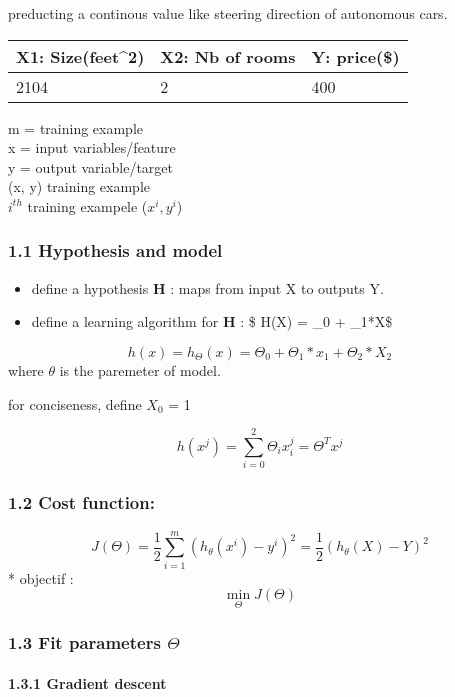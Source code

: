 \documentclass[11pt]{article}
\providecommand{\tightlist}{%
      \setlength{\itemsep}{0pt}\setlength{\parskip}{0pt}}
\begin{document}
preducting a continous value like steering direction of autonomous cars.

\begin{longtable}[]{@{}lll@{}}
\toprule
X1: Size(feet\^{}2) & X2: Nb of rooms & Y: price(\$)\tabularnewline
\midrule
\endhead
2104 & 2 & 400\tabularnewline
\bottomrule
\end{longtable}

m = training example\\
x = input variables/feature\\
y = output variable/target\\
(x, y) training example\\
\(i^{th}\) training exampele (\(x^{i}, y^{i}\))

\subsubsection{1.1 Hypothesis and model}\label{hypothesis-and-model}

\begin{itemize}
\tightlist
\item
  define a hypothesis \textbf{H} : maps from input X to outputs Y.
\item
  define a learning algorithm for \textbf{H} : \$ H(X) = \theta\_0 +
  \theta\_1*X\$
\end{itemize}

\[h(x) = h_{\Theta}(x) = \Theta_0 + \Theta_1*x_1 + \Theta_2*X_2 \] where
\({\theta}\) is the paremeter of model.

for conciseness, define \(X_0\) = 1

\[ h(x^j) = \sum_{i = 0}^2 \Theta_ix_i^j = \Theta^Tx^j \]

\subsubsection{1.2 Cost function:}\label{cost-function}

\[ J(\Theta) = \frac{1}{2} \sum_{i=1}^m (h_\theta(x^i) - y^i)^2 = \frac{1}{2} (h_\theta(X) - Y)^2\]
* objectif : \[\underset{\Theta}{\min} J(\Theta) \]

\subsubsection{\texorpdfstring{1.3 Fit parameters
\(\Theta\)}{1.3 Fit parameters \textbackslash{}Theta}}\label{fit-parameters-theta}

\paragraph{1.3.1 Gradient descent}\label{gradient-descent}
\end{document}
